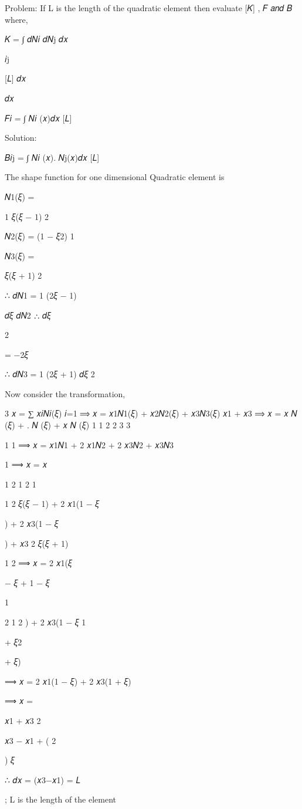 {{{{{Problem:
If L is the length of the quadratic element then evaluate [𝐾] , {𝐹} 𝑎𝑛𝑑 {𝐵} where,

𝐾	= ∫	𝑑𝑁𝑖 𝑑𝑁j 𝑑𝑥
 
𝑖j
 
[𝐿] 𝑑𝑥
 
𝑑𝑥
 

𝐹𝑖 = ∫ 𝑁𝑖 (𝑥)𝑑𝑥
[𝐿]


 



Solution:
 
𝐵𝑖j = ∫ 𝑁𝑖 (𝑥). 𝑁j(𝑥)𝑑𝑥
[𝐿]
 
The shape function for one dimensional Quadratic element is

 
𝑁1(𝜉) =
 
1
  𝜉(𝜉 − 1)
2
 
𝑁2(𝜉) = (1 − 𝜉2)
1
 
𝑁3(𝜉) =
 
  𝜉(𝜉 + 1)
2
 
∴ 𝑑𝑁1 = 1 (2𝜉 − 1)
 
𝑑𝜉
𝑑𝑁2
∴
𝑑𝜉
 
2

= −2𝜉
 
∴ 𝑑𝑁3 = 1 (2𝜉 + 1)
𝑑𝜉	2
 
Now consider the transformation,

3
𝑥 = ∑ 𝑥𝑖𝑁𝑖(𝜉)
𝑖=1
⟹ 𝑥 = 𝑥1𝑁1(𝜉) + 𝑥2𝑁2(𝜉) + 𝑥3𝑁3(𝜉)
𝑥1 + 𝑥3
⟹ 𝑥 = 𝑥 𝑁 (𝜉) +	. 𝑁 (𝜉) + 𝑥 𝑁 (𝜉)
1  1	2	2	3  3

1	1
⟹ 𝑥 = 𝑥1𝑁1 + 2 𝑥1𝑁2 + 2 𝑥3𝑁2 + 𝑥3𝑁3

 
1
⟹ 𝑥 = 𝑥  
 
1	2	1	2	1
 
1 2 𝜉(𝜉 − 1) + 2 𝑥1(1 − 𝜉
 
) + 2 𝑥3(1 − 𝜉
 
) + 𝑥3 2 𝜉(𝜉 + 1)
 

 
1	2
⟹ 𝑥 = 2 𝑥1(𝜉
 
− 𝜉 + 1 − 𝜉

1
 
2	1	2
) + 2 𝑥3(1 − 𝜉
1
 
+ 𝜉2
 
+ 𝜉)
 
⟹ 𝑥 = 2 𝑥1(1 − 𝜉) + 2 𝑥3(1 + 𝜉)
 

⟹ 𝑥 =
 
𝑥1 + 𝑥3 2
 
𝑥3 − 𝑥1
+ (
2
 

) 𝜉
 
∴ 𝑑𝑥 = (𝑥3−𝑥1) = 𝐿
 
; L is the length of the element
 
}}}}}
